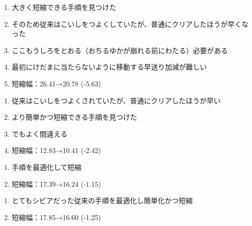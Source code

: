 \begin{enumerate}[label={\sarrow}]
\item 大きく短縮できる手順を見つけた
\item そのため従来はこいしをつよくしていたが、普通にクリアしたほうが早くなった
\item ここもうしろをとおる（おちるゆかが崩れる前にわたる）必要がある
\item 最初にけだまに当たらないように移動する早送り加減が難しい
\item 短縮幅：26.41→20.78 (-5.63)
\end{enumerate}



\clearpage
\begin{enumerate}[label={\sarrow}]
\item 従来はこいしをつよくされていたが、普通にクリアしたほうが早い
\item より簡単かつ短縮できる手順を見つけた
\item でもよく間違える
\item 短縮幅：12.83→10.41 (-2.42)
\end{enumerate}



\begin{enumerate}[label={\sarrow}]
\item 手順を最適化して短縮
\item 短縮幅：17.39→16.24 (-1.15)
\end{enumerate}



\begin{enumerate}[label={\sarrow}]
\item とてもシビアだった従来の手順を最適化し簡単化かつ短縮
\item 短縮幅：17.85→16.60 (-1.25)
\end{enumerate}



